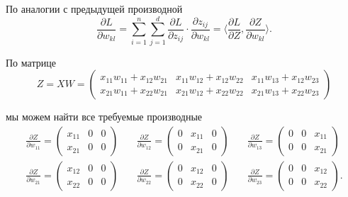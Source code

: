 \begin{sol}
По аналогии с предыдущей производной 
\[
\frac{\partial L}{\partial w_{kl}} = \sum_{i=1}^n \sum_{j=1}^d \frac{\partial L}{\partial z_{ij}} \cdot \frac{\partial z_{ij}}{\partial w_{kl}} = \langle \frac{\partial L}{\partial Z} , \frac{\partial Z}{\partial w_{kl}} \rangle.
\]

По матрице 
\[
	Z = XW = \begin{pmatrix} x_{11}w_{11} + x_{12}w_{21} & x_{11}w_{12} + x_{12}w_{22} & x_{11}w_{13} + x_{12}w_{23} \\ x_{21}w_{11} + x_{22}w_{21} & x_{21}w_{12} + x_{22}w_{22} & x_{21}w_{13} + x_{22}w_{23} \end{pmatrix}
\]

мы можем найти все требуемые производные
\begin{equation*}
    \begin{aligned}
        \frac{\partial Z}{\partial w_{11}} = \begin{pmatrix} x_{11} & 0 & 0 \\ x_{21} & 0 & 0 \end{pmatrix} & \quad \frac{\partial Z}{\partial w_{12}} = \begin{pmatrix} 0 & x_{11} & 0 \\  0 & x_{21} & 0 \end{pmatrix} & \quad \frac{\partial Z}{\partial w_{13}} = \begin{pmatrix} 0  & 0 & x_{11}\\  0  & 0 & x_{21}\end{pmatrix}  \\
        \frac{\partial Z}{\partial w_{21}} = \begin{pmatrix} x_{12} & 0 & 0 \\ x_{22} & 0 & 0 \end{pmatrix}  & \quad  \frac{\partial Z}{\partial w_{22}} = \begin{pmatrix} 0 & x_{12} & 0 \\  0 & x_{22} & 0 \end{pmatrix}  & \quad \frac{\partial Z}{\partial w_{23}} = \begin{pmatrix} 0  & 0 & x_{12}\\  0  & 0 & x_{22}\end{pmatrix}.
    \end{aligned}
\end{equation*}


\end{sol}
